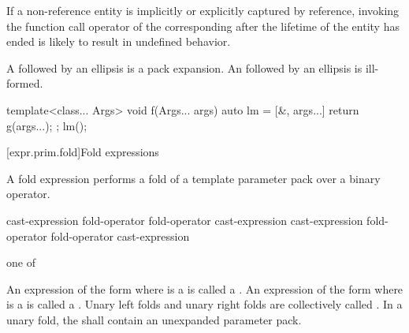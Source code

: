 \pnum
\begin{note} If a non-reference entity is implicitly or explicitly captured by reference,
invoking the function call operator of the corresponding 
after the lifetime of the entity has ended is likely to result in undefined behavior.
\end{note}

\pnum
A  followed by an ellipsis is a pack
expansion. An  followed by an
ellipsis is ill-formed.
\begin{example}
\begin{codeblock}
template<class... Args>
void f(Args... args) {
  auto lm = [&, args...] { return g(args...); };
  lm();
}
\end{codeblock}
\end{example}%

[expr.prim.fold]{Fold expressions}%

\pnum
A fold expression performs a fold of a template parameter
pack over a binary operator.

\begin{bnf}
\br
    \terminal{(} cast-expression fold-operator  \terminal{)}\br
    \terminal{(}  fold-operator cast-expression \terminal{)}\br
    \terminal{(} cast-expression fold-operator  fold-operator cast-expression \terminal{)}
\end{bnf}

\begin{bnf}
 \textnormal{one of}\br
    \terminal{+ }\quad\terminal{- }\quad\terminal{* }\quad\terminal{/ }\quad\terminal{\% }\quad\terminal{\caret{} }\quad\terminal{\& }\quad\terminal{| }\quad\terminal{<< }\quad\terminal{>> }\br
    \terminal{+=}\quad\terminal{-=}\quad\terminal{*=}\quad\terminal{/=}\quad\terminal{\%=}\quad\terminal{\caret=}\quad\terminal{\&=}\quad\terminal{|=}\quad\terminal{<<=}\quad\terminal{>>=}\quad\terminal{=}\br
    \terminal{==}\quad\terminal{!=}\quad\terminal{< }\quad\terminal{> }\quad\terminal{<=}\quad\terminal{>=}\quad\terminal{\&\&}\quad\terminal{||}\quad\terminal{,  }\quad{}\quad\terminal{->*}
\end{bnf}

\pnum
{}%
An expression of the form
  
where  is a 
is called a .
An expression of the form
  
where  is a 
is called a .
Unary left folds and unary right folds
are collectively called .
In a unary fold,
the 
shall contain an unexpanded parameter pack.

